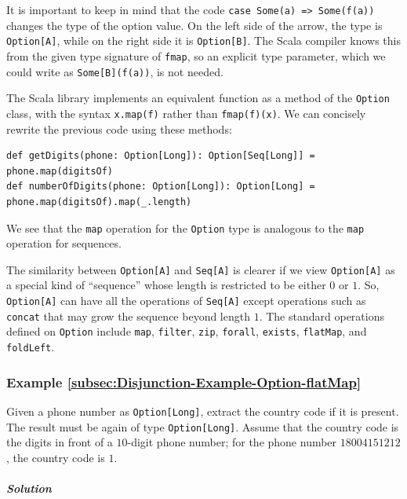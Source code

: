It is important to keep in mind that the code \lstinline!case Some(a) => Some(f(a))!
changes the type of the option value. On the left side of the arrow,
the type is \lstinline!Option[A]!, while on the right side it is
\lstinline!Option[B]!. The Scala compiler knows this from the given
type signature of \lstinline!fmap!, so an explicit type parameter,
which we could write as \lstinline!Some[B](f(a))!, is not needed.

The Scala library implements an equivalent function as a method of
the \lstinline!Option! class, with the syntax \lstinline!x.map(f)!
rather than \lstinline!fmap(f)(x)!. We can concisely rewrite the
previous code using these methods:
\begin{lstlisting}
def getDigits(phone: Option[Long]): Option[Seq[Long]] = phone.map(digitsOf)
def numberOfDigits(phone: Option[Long]): Option[Long] = phone.map(digitsOf).map(_.length)
\end{lstlisting}
We see that the \lstinline!map! operation for the \lstinline!Option!
type is analogous to the \lstinline!map! operation for sequences. 

The similarity between \lstinline!Option[A]! and \lstinline!Seq[A]!
is clearer if we view \lstinline!Option[A]! as a special kind of
\textsf{``}sequence\textsf{''} whose length is restricted to be either $0$ or $1$.
So, \lstinline!Option[A]! can have all the operations of \lstinline!Seq[A]!
except operations such as \lstinline!concat! that may grow the sequence
beyond length $1$. The standard operations defined on \lstinline!Option!
include \lstinline!map!, \lstinline!filter!, \lstinline!zip!, \lstinline!forall!,
\lstinline!exists!, \lstinline!flatMap!, and \lstinline!foldLeft!.

\subsubsection{Example \label{subsec:Disjunction-Example-Option-flatMap}\ref{subsec:Disjunction-Example-Option-flatMap}}

Given a phone number as \lstinline!Option[Long]!, extract the country
code if it is present. The result must be again of type \lstinline!Option[Long]!.
Assume that the country code is the digits in front of a $10$-digit
phone number; for the phone number $18004151212$, the country code
is $1$. 

\subparagraph{Solution}

